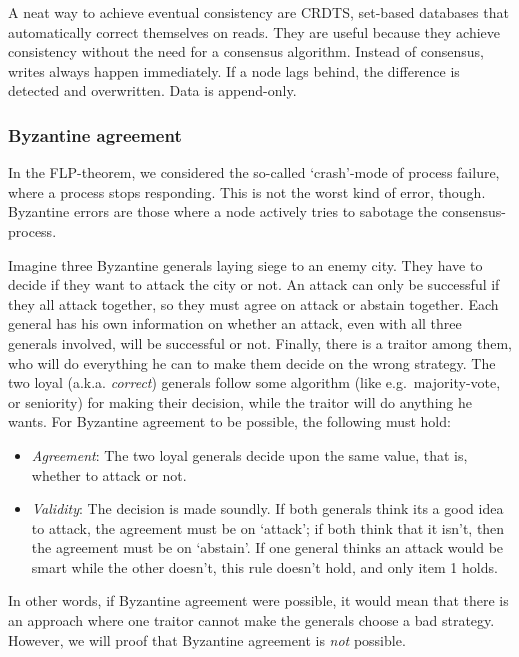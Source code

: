 A neat way to achieve eventual consistency are CRDTS, set-based
databases that automatically correct themselves on reads. They are
useful because they achieve consistency without the need for a consensus
algorithm. Instead of consensus, writes always happen immediately. If a
node lags behind, the difference is detected and overwritten. Data is
append-only.

\hypertarget{byzantine-agreement}{%
\subsubsection{Byzantine agreement}\label{byzantine-agreement}}

In the FLP-theorem, we considered the so-called `crash'-mode of process
failure, where a process stops responding. This is not the worst kind of
error, though. Byzantine errors are those where a node actively tries to
sabotage the consensus-process.

Imagine three Byzantine generals laying siege to an enemy city. They
have to decide if they want to attack the city or not. An attack can
only be successful if they all attack together, so they must agree on
attack or abstain together. Each general has his own information on
whether an attack, even with all three generals involved, will be
successful or not. Finally, there is a traitor among them, who will do
everything he can to make them decide on the wrong strategy. The two
loyal (a.k.a. \emph{correct}) generals follow some algorithm (like
e.g.~majority-vote, or seniority) for making their decision, while the
traitor will do anything he wants. For Byzantine agreement to be
possible, the following must hold:

\begin{itemize}
 
\item
  \emph{Agreement}: The two loyal generals decide upon the same value,
  that is, whether to attack or not.
\item
  \emph{Validity}: The decision is made soundly. If both generals think
  its a good idea to attack, the agreement must be on `attack'; if both
  think that it isn't, then the agreement must be on `abstain'. If one
  general thinks an attack would be smart while the other doesn't, this
  rule doesn't hold, and only item 1 holds.
\end{itemize}

In other words, if Byzantine agreement were possible, it would mean that
there is an approach where one traitor cannot make the generals choose a
bad strategy. However, we will proof that Byzantine agreement is
\emph{not} possible.

